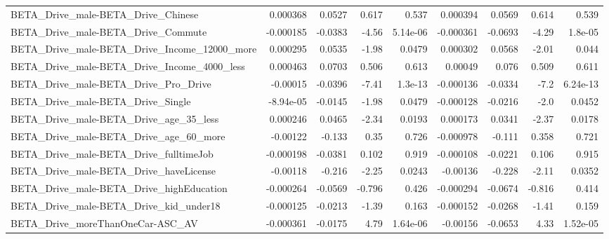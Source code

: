 \begin{tabular}{lrrrrrrrr}
BETA\_Drive\_male-BETA\_Drive\_Chinese                 &    0.000368 &       0.0527 &     0.617 &    0.537 &   0.000394 &      0.0569 &        0.614 &         0.539 \\
BETA\_Drive\_male-BETA\_Drive\_Commute                 &   -0.000185 &      -0.0383 &     -4.56 & 5.14e-06 &  -0.000361 &     -0.0693 &        -4.29 &       1.8e-05 \\
BETA\_Drive\_male-BETA\_Drive\_Income\_12000\_more       &    0.000295 &       0.0535 &     -1.98 &   0.0479 &   0.000302 &      0.0568 &        -2.01 &         0.044 \\
BETA\_Drive\_male-BETA\_Drive\_Income\_4000\_less        &    0.000463 &       0.0703 &     0.506 &    0.613 &    0.00049 &       0.076 &        0.509 &         0.611 \\
BETA\_Drive\_male-BETA\_Drive\_Pro\_Drive               &    -0.00015 &      -0.0396 &     -7.41 &  1.3e-13 &  -0.000136 &     -0.0334 &         -7.2 &      6.24e-13 \\
BETA\_Drive\_male-BETA\_Drive\_Single                  &   -8.94e-05 &      -0.0145 &     -1.98 &   0.0479 &  -0.000128 &     -0.0216 &         -2.0 &        0.0452 \\
BETA\_Drive\_male-BETA\_Drive\_age\_35\_less             &    0.000246 &       0.0465 &     -2.34 &   0.0193 &   0.000173 &      0.0341 &        -2.37 &        0.0178 \\
BETA\_Drive\_male-BETA\_Drive\_age\_60\_more             &    -0.00122 &       -0.133 &      0.35 &    0.726 &  -0.000978 &      -0.111 &        0.358 &         0.721 \\
BETA\_Drive\_male-BETA\_Drive\_fulltimeJob             &   -0.000198 &      -0.0381 &     0.102 &    0.919 &  -0.000108 &     -0.0221 &        0.106 &         0.915 \\
BETA\_Drive\_male-BETA\_Drive\_haveLicense             &    -0.00118 &       -0.216 &     -2.25 &   0.0243 &   -0.00136 &      -0.228 &        -2.11 &        0.0352 \\
BETA\_Drive\_male-BETA\_Drive\_highEducation           &   -0.000264 &      -0.0569 &    -0.796 &    0.426 &  -0.000294 &     -0.0674 &       -0.816 &         0.414 \\
BETA\_Drive\_male-BETA\_Drive\_kid\_under18             &   -0.000125 &      -0.0213 &     -1.39 &    0.163 &  -0.000152 &     -0.0268 &        -1.41 &         0.159 \\
BETA\_Drive\_moreThanOneCar-ASC\_AV                   &   -0.000361 &      -0.0175 &      4.79 & 1.64e-06 &   -0.00156 &     -0.0653 &         4.33 &      1.52e-05 \\

\end{tabular}
